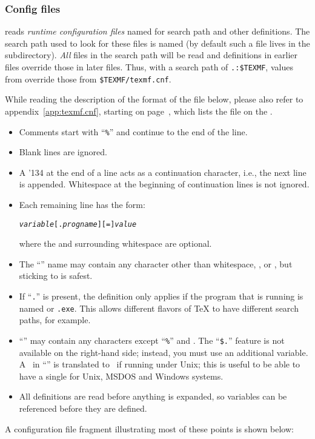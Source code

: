 \documentclass{article}
\def\bs{{\protect\normalfont\ttfamily\char'134}}
\begin{document}
\subsubsection{Config files}

\KPS{} reads \emph{runtime configuration files} named 
for search path and other definitions.  The search path used to look
for these files is named  (by default such a file lives
in the  subdirectory).  \emph{All}
 files in the search path will be read and definitions
in earlier files override those in later files.  Thus, with a search
path of \verb|.:$TEXMF|, values from  override those
from \verb|$TEXMF/texmf.cnf|.


While reading the description of the format of the file
 below, please also refer to
appendix~\ref{app:texmf.cnf}, starting on
page~\pageref{app:texmf.cnf}, which lists the  file on
the \CD.

\begin{itemize}
\item 
  Comments start with ``\texttt{\%}'' and continue to the end of the line.
\item 
  Blank lines are ignored.
\item
  A \bs{} at the end of a line acts as a continuation character,
  i.e., the next line is appended.  Whitespace at the beginning of
  continuation lines is not ignored.
\item 
  Each remaining line has the form:
\begin{alltt}
  \emph{variable}[.\emph{progname}] [=] \emph{value}
\end{alltt}%
  where the \samp{=} and surrounding whitespace are optional.
\item 
  The ``\texttt{}'' name may contain any character other
  than whitespace, \samp{=}, or , but sticking to
   is safest.
\item 
  If ``\texttt{.}'' is present, the definition only
  applies if the program that is running is named
  \texttt{} or \texttt{.exe}.  This allows
  different flavors of \TeX{} to have different search paths, for
  example.
\item ``\texttt{}'' may contain any characters except
  ``\texttt{\%}'' and .  The
  ``\texttt{\$.}'' feature is not available on the
  right-hand side; instead, you must use an additional variable.  A
  \samp{;}\ in ``\texttt{}'' is translated to \samp{:}\ if
  running under Unix; this is useful to be able to have a single
   for Unix, MSDOS and Windows systems.
\item 
  All definitions are read before anything is expanded, so
  variables can be referenced before they are defined.
\end{itemize}
A configuration file fragment illustrating most of these points is
\ifSingleColumn
shown below:
\end{document}
